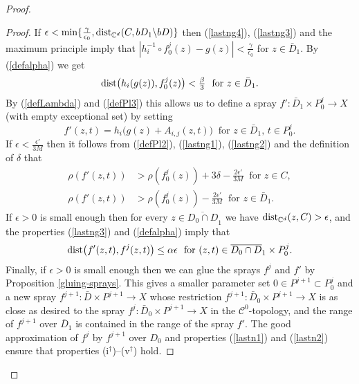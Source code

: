\documentclass[11pt]{amsart}
\numberwithin{equation}{section}
\theoremstyle{definition}
\begin{document}
\begin{proof}
\begin{proof}
If ${\epsilon}< \min\{\frac{\gamma}{\epsilon_0}, {\rm dist}_{{\mathbb{C}}^d}(C,bD_1 {\backslash} bD)\}$ 
then (\ref{lastng4}), (\ref{lastng3}) and the maximum principle imply that 
$|h_i^{-1}\circ f_0^j(z)-g(z)| < \frac{\gamma}{\epsilon_0}$ for $z\in \bar D_1$.
By (\ref{defalpha}) we get
\[
	{\rm dist}\bigl(h_i(g(z)),f_0^j(z)\bigr) < \tfrac\beta{3}\ \text{ for } z\in \bar D_1.
\]
By (\ref{defLambda}) and (\ref{defPl3}) this allows us to define a spray
$f'\colon\bar D_1\times P^j_0 \to X$ (with empty exceptional set) 
by setting
\[
		f'(z,t)=h_i\bigl(g(z)+A_{i,j}(z,t) \bigr)
			\ \text{ for }z \in \bar D_1,\,t\in P^j_0.
\]
If $\epsilon<\tfrac{\epsilon'}{3M}$ then it follows from (\ref{defPl2}),
(\ref{lastng1}), (\ref{lastng2})  and the definition
of $\delta$ that
\begin{align}
	\rho(f'(z,t))&> \rho(f_0^j(z))+3\delta-\tfrac{2{\epsilon}'}{3M}\ \text{ for }z\in C, \label{lastn1}\\    
	\rho(f'(z,t))&>\rho(f_0^j(z))-\tfrac{2{\epsilon}'}{3M} \ \text{ for }z\in\bar D_1.\label{lastn2}
\end{align}
If $\epsilon>0$ is small enough then for every $z\in \overline{D_0\cap  D}_1$ 
we have ${\rm dist}_{{\mathbb{C}}^d}(z,C)>\epsilon$, and the properties  
(\ref{lastng3}) and (\ref{defalpha}) imply that
\[
	{\rm dist}\bigl(f'(z,t),f^j(z,t)\bigr) \le \alpha\epsilon  \ \text{ for }
		(z,t)\in \overline{D_0\cap  D}_1 \times P_0^j.
\]
Finally, if ${\epsilon}>0$ is small enough then  we can
glue the sprays $f^j$ and $f'$ by Proposition \ref{gluing-sprays}. 
This gives a smaller parameter set $0\in P^{j+1} \subset P^j_0$ and
a new spray $f^{j+1}\colon \bar D \times P^{j+1} \to X$ 
whose restriction $f^{j+1}\colon \bar D_0\times P^{j+1} \to X$ 
is as close as desired to the spray 
$f^j \colon \bar D_0\times P^{j+1} \to X$ in the ${\mathcal{C}}^0$-topology,  
and the range of $f^{j+1}$ over $\overline D_1$ is contained 
in the range of the spray $f'$. 
The good approximation of $f^{j}$ by $f^{j+1}$ over $D_0$ and properties
(\ref{lastn1}) and (\ref{lastn2}) ensure that properties 
(i$^\dagger$)--(v$^\dagger$) hold. 
\end{proof}


\end{proof}
\end{document}
